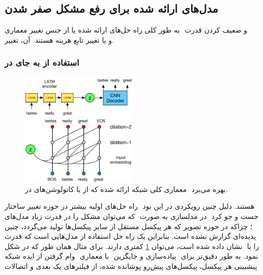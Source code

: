 \subsection{مدل‌های ارائه شده برای رفع مشکل صفر شدن }
به طور کلی راه حل‌های ارائه شده یا از جنس تغییر معماری ‎\decoder{}‎ و ضعیف کردن قدرت ‎\autoregressive{}‎ آن، تغییر ‎\priordist{}‎ و یا تغییر تابع هزینه هستند.
\\
\subsubsection{استفاده از \cnn{} به جای \lstm{} در \decoder{}}
\begin{figure}[h]
	\centering
	\includegraphics[width=0.5\textwidth]{images/dialated-conv1.png}

	\vspace{0.5cm}

	\includegraphics[width=0.5\textwidth]{images/dialated-conv2.png}
	\caption{
		معماری کلی شبکه ارائه شده که از \cnn{}  با کانولوشن‌های \dilated{} در  ‎\decoder{}‎ بهره می‌برد.
	}
	\label{fig:dialted_conv}
\end{figure}
راه حل‌های اولیه بیشتر در حوزه تغییر ساختار ‎\decoder{}‎ هستند. دلیل چنین رویکردی در این بود که می‌توان مشکل را در قدرت زیاد مدل‌های ‎\lstm{} در مدلسازی به صورت ‎\autoregressive{}‎ جست و جو کرد \cite{vae_dialated}؛ چراکه در حوزه تصویر که هر پیکسل مستقل از سایر پیکسل‌ها تولید می‌گردد، چنین پدیده‌ای گزارش نشده است. بنابراین یک راه حل استفاده از مدل‌هایی است که قدرت \autoregressive{} کمتری دارند. برای مثال همان طور که در شکل ‎\ref{fig:dialted_conv}‎ نشان داده شده است، می‌توان ‎\decoder{}‎ را با وام گرفتن از ایده شبکه ‎‎ با معماری ‎\cnn{}‎ پیاده‌سازی و جایگزین ‎\lstm{}‎ نمود. به طور دقیق‌تر برای پیشبینی هر پیکسل، پیکسل‌های پیش‌رو پوشانده شده، از فیلتر‌های یک بعدی و اتصالات
